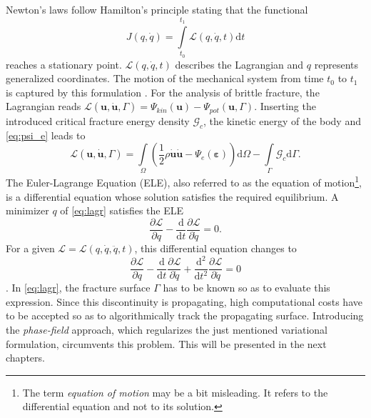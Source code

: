 Newton's laws follow Hamilton's principle stating that the functional 
\begin{equation} \label{eq:fctal_Hamilton}
	J\left(q,\dot{q}\right)=\int\limits_{t_{0}}^{t_{1}}\mathcal{L}\left(q,\dot{q},t\right)\mathrm{d}t
\end{equation} reaches a stationary point. $\mathcal{L}\left(q,\dot{q},t\right)$ describes the Lagrangian and $q$ represents generalized coordinates. The motion of the mechanical system from time $t_{0}$ to $t_{1}$ is captured by this formulation \citep{01_B_LagrMech}. For the analysis of brittle fracture, the Lagrangian reads $\mathcal{L}\left(\mathbf{u},\dot{\mathbf{u}},\Gamma\right)=\Psi_{kin}\left(\mathbf{u}\right)-\Psi_{pot}\left(\mathbf{u},\Gamma\right)$. Inserting the introduced critical fracture energy density $\mathcal{G}_{c}$, the kinetic energy of the body and \eqref{eq:psi_e} leads to
\begin{equation} \label{eq:lagr}
	\mathcal{L}\left(\mathbf{u},\dot{\mathbf{u}},\Gamma\right) = \int\limits_{\Omega}\left(\frac{1}{2}\rho\dot{\mathbf{u}}\dot{\mathbf{u}}-\Psi_{e}\left(\bm{\varepsilon}\right)\right)\mathrm{d}\Omega - \int\limits_{\Gamma}\mathcal{G}_{c}\mathrm{d}\Gamma.
\end{equation}
The Euler-Lagrange Equation (ELE), also referred to as the equation of motion\footnote{The term \textit{equation of motion} may be a bit misleading. It refers to the differential equation and not to its solution.}, is a differential equation whose solution satisfies the required equilibrium. A minimizer $q$ of \eqref{eq:lagr} satisfies the ELE
\begin{equation} \label{eq:ELE_O2}
	\dfrac{\partial\mathcal{L}}{\partial q}-\dfrac{\mathrm{d}}{\mathrm{d}t}\dfrac{\partial\mathcal{L}}{\partial\dot{q}}=0.
\end{equation}
For a given $\mathcal{L}=\mathcal{L}\left(q,\dot{q},\ddot{q}, t\right)$, this differential equation changes to
\begin{equation} \label{eq:ELE:_O4}
	\dfrac{\partial\mathcal{L}}{\partial q}-\dfrac{\mathrm{d}}{\mathrm{d}t}\dfrac{\partial\mathcal{L}}{\partial\dot{q}}+\dfrac{\mathrm{d}^{2}}{\mathrm{d}t^{2}}\dfrac{\partial\mathcal{L}}{\partial\ddot{q}}=0
\end{equation}
\citep{01_B_LagrMech}. In \eqref{eq:lagr}, the fracture surface $\Gamma$ has to be known so as to evaluate this expression. Since this discontinuity is propagating, high computational costs have to be accepted so as to algorithmically track the propagating surface. Introducing the \textit{phase-field} approach, which regularizes the just mentioned variational formulation, circumvents this problem. This will be presented in the next chapters.

